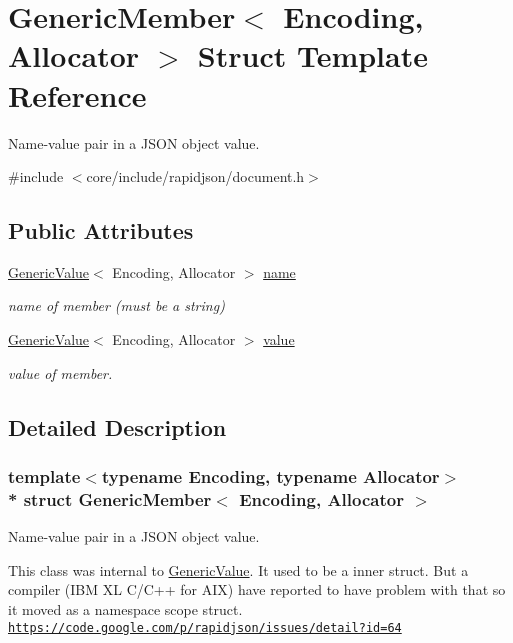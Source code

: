 \hypertarget{structGenericMember}{}\section{Generic\+Member$<$ Encoding, Allocator $>$ Struct Template Reference}
\label{structGenericMember}


Name-\/value pair in a J\+S\+ON object value.  




{\ttfamily \#include $<$core/include/rapidjson/document.\+h$>$}

\subsection*{Public Attributes}
\begin{DoxyCompactItemize}
\item 
\hyperlink{classGenericValue}{Generic\+Value}$<$ Encoding, Allocator $>$ \hyperlink{structGenericMember_a7124f7ccd67421533d33139938604fac}{name}
\begin{DoxyCompactList}\small\item\em name of member (must be a string) \end{DoxyCompactList}\item 
\hyperlink{classGenericValue}{Generic\+Value}$<$ Encoding, Allocator $>$ \hyperlink{structGenericMember_aad3cfa4f9e8b9018068c8bc865723083}{value}
\begin{DoxyCompactList}\small\item\em value of member. \end{DoxyCompactList}\end{DoxyCompactItemize}


\subsection{Detailed Description}
\subsubsection*{template$<$typename Encoding, typename Allocator$>$\\*
struct Generic\+Member$<$ Encoding, Allocator $>$}

Name-\/value pair in a J\+S\+ON object value. 

This class was internal to \hyperlink{classGenericValue}{Generic\+Value}. It used to be a inner struct. But a compiler (I\+BM XL C/\+C++ for A\+IX) have reported to have problem with that so it moved as a namespace scope struct. \href{https://code.google.com/p/rapidjson/issues/detail?id=64}{\tt https\+://code.\+google.\+com/p/rapidjson/issues/detail?id=64} 

